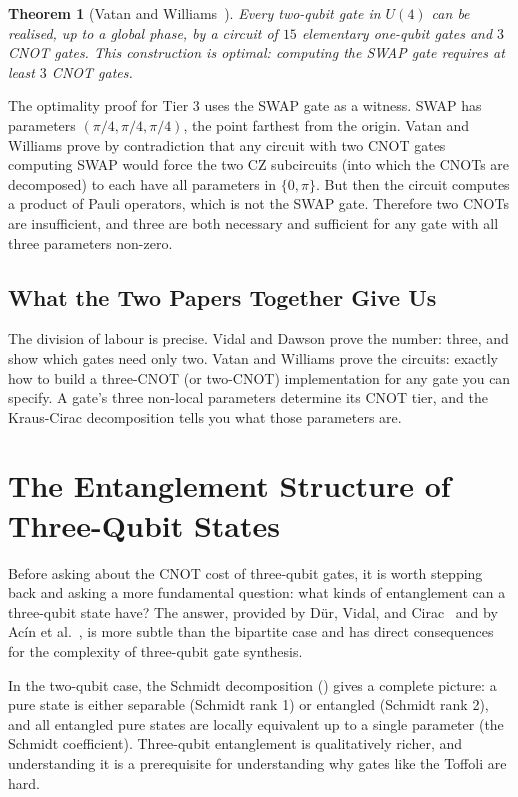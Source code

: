 \documentclass[12pt, a4paper, oneside]{report}
\theoremstyle{plain}
\newtheorem{theorem}{Theorem}[chapter]
\theoremstyle{definition}
\theoremstyle{remark}
\begin{document}
\begin{theorem}[Vatan and Williams~\cite{vatan2004}]
	\label{thm:vatan-williams}
	Every two-qubit gate in $U(4)$ can be realised, up to a global phase, by a circuit of
	$15$ elementary one-qubit gates and $3$ CNOT gates. This construction is optimal: computing
	the SWAP gate requires at least $3$ CNOT gates.
\end{theorem}

The optimality proof for Tier 3 uses the SWAP gate as a witness. SWAP has parameters
$({\pi}/{4}, {\pi}/{4}, {\pi}/{4})$, the point farthest from the origin. Vatan and Williams prove by contradiction that any circuit with two CNOT gates
computing SWAP would force the two CZ subcircuits (into which the CNOTs are decomposed) to
each have all parameters in $\{0, \pi\}$. But then the circuit computes a product of Pauli
operators, which is not the SWAP gate. Therefore two CNOTs are insufficient, and three are
both necessary and sufficient for any gate with all three parameters non-zero.

\subsection{What the Two Papers Together Give Us}

The division of labour is precise. Vidal and Dawson prove the number: three, and show which
gates need only two. Vatan and Williams prove the circuits: exactly how to build a three-CNOT
(or two-CNOT) implementation for any gate you can specify. A gate's three non-local parameters determine its CNOT
tier, and the Kraus-Cirac decomposition tells you what those
parameters are.


\section{The Entanglement Structure of Three-Qubit States}
\label{sec:three-qubit-ent}

Before asking about the CNOT cost of three-qubit gates, it is worth stepping back and asking
a more fundamental question: what kinds of entanglement can a three-qubit state have? The
answer, provided by Dür, Vidal, and Cirac~\cite{dur2000} and by Acín et al.~\cite{acin2000},
is more subtle than the bipartite case and has direct consequences for the complexity of
three-qubit gate synthesis.

In the two-qubit case, the Schmidt decomposition () gives a complete
picture: a pure state is either separable (Schmidt rank 1) or entangled (Schmidt rank 2),
and all entangled pure states are locally equivalent up to a single parameter (the Schmidt
coefficient). Three-qubit entanglement is qualitatively richer, and understanding it is a
prerequisite for understanding why gates like the Toffoli are hard.
\end{document}
